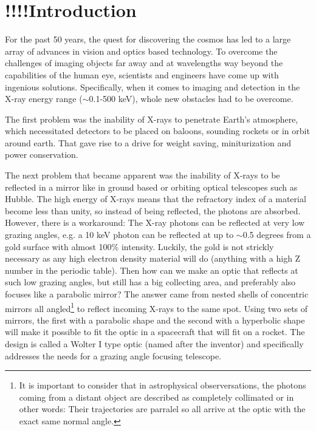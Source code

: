 \chapter{!!!!Introduction}
For the past 50 years, the quest for discovering the cosmos has led to a large array of advances in vision and optics based technology. To overcome the challenges of imaging objects far away and at wavelengths way beyond the capabilities of the human eye, scientists and engineers have come up with ingenious solutions. Specifically, when it comes to imaging and detection in the X-ray energy range ($\sim$0.1-500 keV), whole new obstacles had to be overcome.

The first problem was the inability of X-rays to penetrate Earth's atmosphere, which necessitated detectors to be placed on baloons, sounding rockets or in orbit around earth. That gave rise to a drive for weight saving, miniturization and power conservation.

The next problem that became apparent was the inability of X-rays to be reflected in a mirror like in ground based or orbiting optical telescopes such as Hubble. The high energy of X-rays means that the refractory index of a material become less than unity, so instead of being reflected, the photons are absorbed. However, there is a workaround: The X-ray photons can be reflected at very low grazing angles, e.g. a 10 keV photon can be reflected at up to $\sim$0.5 degrees from a gold surface with almost 100\% intensity. Luckily, the gold is not strickly necessary as any high electron density material will do (anything with a high Z number in the periodic table). Then how can we make an optic that reflects at such low grazing angles, but still has a big collecting area, and preferably also focuses like a parabolic mirror? The answer came from nested shells of concentric mirrors all angled\footnote{It is important to consider that in astrophysical observersations, the photons coming from a distant object are described as completely collimated or in other words: Their trajectories are parralel so all arrive at the optic with the exact same normal angle.} to reflect incoming X-rays to the same spot. Using two sets of mirrors, the first with a parabolic shape and the second with a hyperbolic shape will make it possible to fit the optic in a spacecraft that will fit on a rocket. The design is called a Wolter I type optic\cite{Wolter:1952gt,Wolter:1952ih} (named after the inventor) and specifically addresses the needs for a grazing angle focusing telescope.

